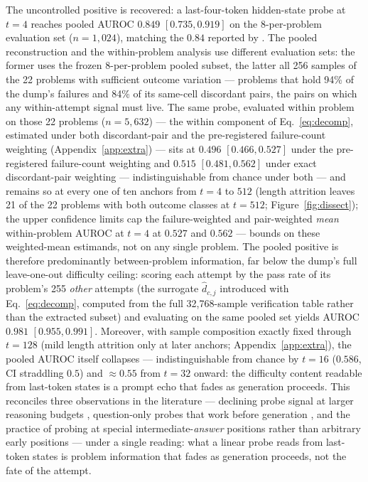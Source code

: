 The uncontrolled positive is recovered: a last-four-token hidden-state probe
at $t = 4$ reaches pooled AUROC $0.849$ $[0.735, 0.919]$ on the
8-per-problem evaluation set ($n{=}1{,}024$), matching the $0.84$
reported by \citet{david2025temporal}. The pooled reconstruction and the
within-problem analysis use different evaluation sets: the former
uses the frozen 8-per-problem pooled subset, the latter all 256
samples of the 22 problems with sufficient outcome variation --- problems
that hold 94\% of the dump's failures and 84\% of its same-cell
discordant pairs, the pairs on which any within-attempt signal must live.
The same probe, evaluated within
problem on those 22 problems ($n{=}5{,}632$) --- the within component of
Eq.~\eqref{eq:decomp}, estimated under both discordant-pair and the
pre-registered failure-count weighting (Appendix~\ref{app:extra}) ---
sits at $0.496$ $[0.466, 0.527]$ under the pre-registered
failure-count weighting and $0.515$ $[0.481, 0.562]$ under exact
discordant-pair weighting --- indistinguishable from chance under both
--- and remains so at every one of ten anchors from $t = 4$ to $512$ (length attrition
leaves 21 of the 22 problems with both outcome classes at $t = 512$;
Figure~\ref{fig:dissect}); the upper confidence limits cap the
failure-weighted and pair-weighted \emph{mean} within-problem AUROC at
$t = 4$ at $0.527$ and $0.562$ --- bounds on these weighted-mean
estimands, not on any single problem. The pooled positive is therefore predominantly
between-problem information, far below the
dump's full leave-one-out difficulty ceiling: scoring each attempt by the
pass rate of its problem's 255 \emph{other} attempts (the surrogate
$\hat d_{c,j}$ introduced with Eq.~\eqref{eq:decomp}, computed from the
full 32{,}768-sample verification table rather than the extracted subset)
and evaluating on the same pooled set yields AUROC $0.981$
$[0.955, 0.991]$. Moreover, with sample composition exactly fixed through
$t = 128$ (mild length attrition only at later anchors;
Appendix~\ref{app:extra}), the pooled AUROC itself collapses --- indistinguishable from chance by $t = 16$ ($0.586$,
CI straddling $0.5$) and $\approx 0.55$ from $t = 32$ onward: the
difficulty content readable from last-token states is a prompt echo that
fades as generation proceeds. This reconciles three observations in the literature ---
declining probe signal at larger reasoning budgets \citep{lugoloobi2026},
question-only probes that work before generation
\citep{cencerrado2025noanswer}, and the practice of probing at special
intermediate-\emph{answer} positions rather than arbitrary early positions
\citep{zhang2025knowright} --- under a single reading: what a linear probe reads from last-token
states is problem information that fades as generation proceeds, not the
fate of the attempt.

